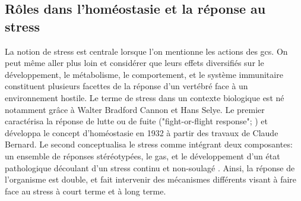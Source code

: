 \documentclass[../main.tex]{subfiles}
\begin{document}
\subsection{Rôles dans l'homéostasie et la réponse au stress}\label{subsec:gc-role-stress}
La notion de stress est centrale lorsque l'on mentionne les actions des \glspl{gc}.
On peut même aller plus loin et considérer que leurs effets diversifiés sur le développement, le métabolisme, le comportement, et le système immunitaire constituent plusieurs facettes de la réponse d'un vertébré face à un environnement hostile.
Le terme de stress dans un contexte biologique est né notamment grâce à Walter Bradford Cannon et Hans Selye.
Le premier caractérisa la réponse de lutte ou de fuite ("fight-or-flight response"; \citealp{Cannon1915}) et développa le concept d'homéostasie en 1932 à partir des travaux de Claude Bernard.
Le second conceptualisa le stress comme intégrant deux composantes:
un ensemble de réponses stéréotypées, le \gls{gas}, et le développement d'un état pathologique découlant d'un stress continu et non-soulagé \citep{Selye1946}.
Ainsi, la réponse de l'organisme est double, et fait intervenir des mécanismes différents visant à faire face au stress à court terme et à long terme.


\end{document}
